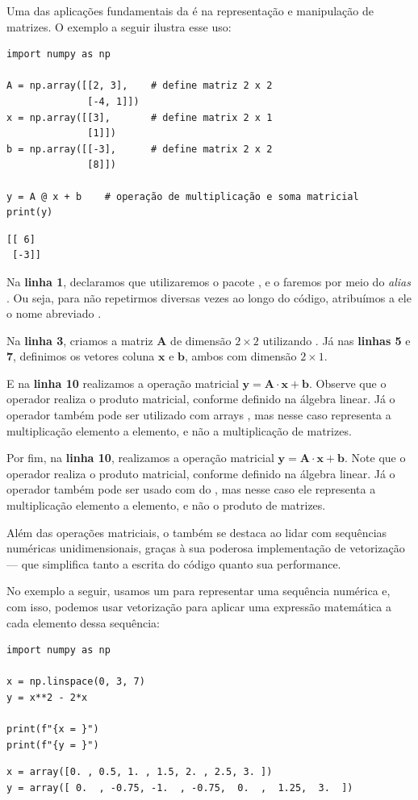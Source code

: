 Uma das aplicações fundamentais da  é na representação e manipulação de matrizes.
O exemplo a seguir ilustra esse uso:
\begin{verbatim}
import numpy as np

A = np.array([[2, 3],    # define matriz 2 x 2
              [-4, 1]])
x = np.array([[3],       # define matrix 2 x 1
              [1]])
b = np.array([[-3],      # define matrix 2 x 2
              [8]])

y = A @ x + b    # operação de multiplicação e soma matricial
print(y)
\end{verbatim}
\begin{verbatim}
[[ 6]
 [-3]]
\end{verbatim}

Na \textbf{linha 1}, declaramos que utilizaremos o pacote , e o faremos por meio do \emph{alias}
.
Ou seja, para não repetirmos  diversas vezes ao longo do código, atribuímos a ele o nome
abreviado .

Na \textbf{linha 3}, criamos a matriz $\mathbf{A}$ de dimensão $2 \times 2$ utilizando .
Já nas \textbf{linhas 5} e \textbf{7}, definimos os vetores coluna $\mathbf{x}$ e $\mathbf{b}$,
ambos com dimensão $2 \times 1$.


E na \textbf{linha 10} realizamos a operação matricial $\mathbf{y} = \mathbf{A} \cdot \mathbf{x} + \mathbf{b}$.
Observe que o operador  realiza o produto matricial, conforme definido na álgebra linear.
Já o operador \inlcode{*} também pode ser utilizado com arrays , mas nesse caso representa
a multiplicação elemento a elemento, e não a multiplicação de matrizes.

Por fim, na \textbf{linha 10}, realizamos a operação matricial $\mathbf{y} = \mathbf{A} \cdot \mathbf{x} + \mathbf{b}$.
Note que o operador  realiza o produto matricial, conforme definido na álgebra linear.
Já o operador \inlcode{*} também pode ser usado com  do ,
mas nesse caso ele representa a multiplicação elemento a elemento, e não o produto de matrizes.

Além das operações matriciais, o  também se destaca ao lidar com sequências numéricas unidimensionais,
graças à sua poderosa implementação de vetorização --- que simplifica tanto a escrita do código quanto sua performance.

No exemplo a seguir, usamos um  para representar uma sequência numérica e, com isso, podemos usar
vetorização para aplicar uma expressão matemática a cada elemento dessa sequência:
\begin{verbatim}
import numpy as np

x = np.linspace(0, 3, 7)
y = x**2 - 2*x

print(f"{x = }")
print(f"{y = }")
\end{verbatim}
\begin{verbatim}
x = array([0. , 0.5, 1. , 1.5, 2. , 2.5, 3. ])
y = array([ 0.  , -0.75, -1.  , -0.75,  0.  ,  1.25,  3.  ])
\end{verbatim}

